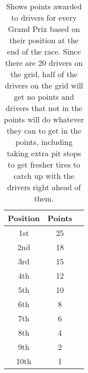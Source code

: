\begin{table}[h]
\centering
\caption{Shows points awarded to drivers for every Grand Prix based on their position at the end of the race. Since there are 20 drivers on the grid, half of the drivers on the grid will get no points and drivers that not in the points will do whatever they can to get in the points, including taking extra pit stops to get fresher tires to catch up with the drivers right ahead of them.}
\label{tab:pos-points}
\vspace{2em}
\begin{tabular}{ccc}
\toprule
Position &  Points \\
\midrule
     1st &      25 \\
     2nd &      18 \\
     3rd &      15 \\
     4th &      12 \\
     5th &      10 \\
     6th &       8 \\
     7th &       6 \\
     8th &       4 \\
     9th &       2 \\
    10th &       1 \\
\bottomrule
\end{tabular}
\end{table}
